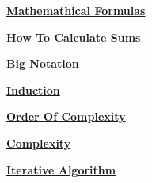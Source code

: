 \documentclass[fleqn]{article}
\begin{document}
\renewcommand{\arrayrulewidth}{0.75mm} %
\setlength{\tabcolsep}{12pt} %
\renewcommand{\arraystretch}{1.5} %

\begin{center}
    \Huge{\textbf{\underline{Mathemathical Formulas}}}
\end{center}

\vspace{0.65cm}


\newpage
\begin{center}
    \Huge{\textbf{\underline{How To Calculate Sums}}}
\end{center}

\vspace{0.65cm}


\newpage
\begin{center}
    \Huge{\textbf{\underline{Big Notation}}}
\end{center}



\vspace{1.5cm}
\begin{center}
    \Huge{\textbf{\underline{Induction}}}
\end{center}




\vspace{1.5cm}
\begin{center}
    \Huge{\textbf{\underline{Order Of Complexity}}}
\end{center}




\vspace{1cm}

\begin{center}
    \Huge{\textbf{\underline{Complexity}}}
\end{center}

\vspace{0.6cm}



\newpage

\begin{center}
    \Huge{\textbf{\underline{Iterative Algorithm}}}
\end{center}

\vspace{0.6cm}


\end{document}
